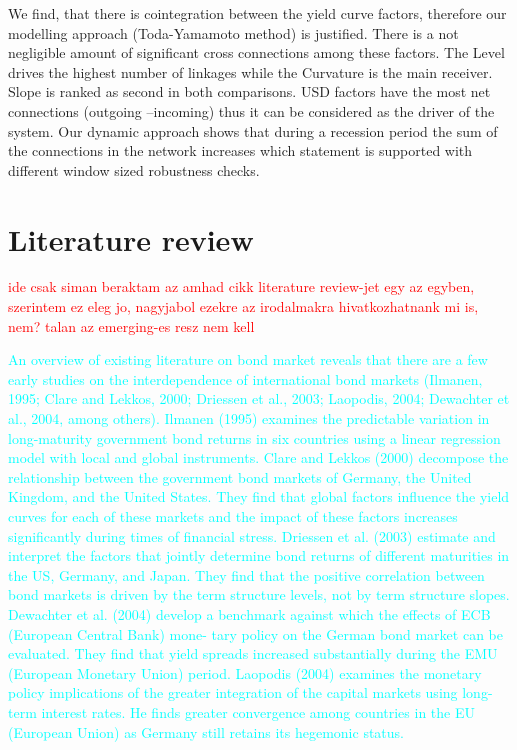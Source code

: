 \documentclass[12pt,bibliography=totoc]{article}
\begin{document}
We find, that there is cointegration between the yield curve factors, therefore our modelling approach (Toda-Yamamoto method) is justified. There is a not negligible amount of significant cross connections among these factors. The Level drives the highest number of linkages while the Curvature is the main receiver. Slope is ranked as second in both comparisons. USD factors have the most net connections (outgoing –incoming) thus it can be considered as the driver of the system. Our dynamic approach shows that during a recession period the sum of the connections in the network increases which statement is supported with different window sized robustness checks.

\newpage

\section{Literature review}

\textcolor{red}{ide csak siman beraktam az amhad cikk literature review-jet egy az egyben, szerintem ez eleg jo, nagyjabol ezekre az irodalmakra hivatkozhatnank mi is, nem? talan az emerging-es resz nem kell}

\textcolor{cyan}{An overview of existing literature on bond market reveals that there are a few early studies on the interdependence of international bond markets (Ilmanen, 1995; Clare and Lekkos, 2000; Driessen et al., 2003; Laopodis, 2004; Dewachter et al., 2004, among others). Ilmanen (1995) examines the predictable variation in long-maturity government bond returns in six countries
using a linear regression model with local and global instruments. Clare and Lekkos (2000) decompose the relationship between the government bond markets of Germany, the United Kingdom, and the United States. They find that global factors influence the yield curves for each of these markets and the impact of these factors increases significantly during times of financial stress.
Driessen et al. (2003) estimate and interpret the factors that jointly determine bond returns of different maturities in the US, Germany, and Japan. They find that the positive correlation between bond markets is driven by the term structure levels, not by term structure slopes. Dewachter et al. (2004) develop a benchmark against which the effects of ECB (European Central Bank) mone-
tary policy on the German bond market can be evaluated. They find that yield spreads increased substantially during the EMU (European Monetary Union) period. Laopodis (2004) examines the monetary policy implications of the greater integration of the capital markets using long-term interest rates. He finds greater convergence among countries in the EU (European Union)
as Germany still retains its hegemonic status.} 
\end{document}
